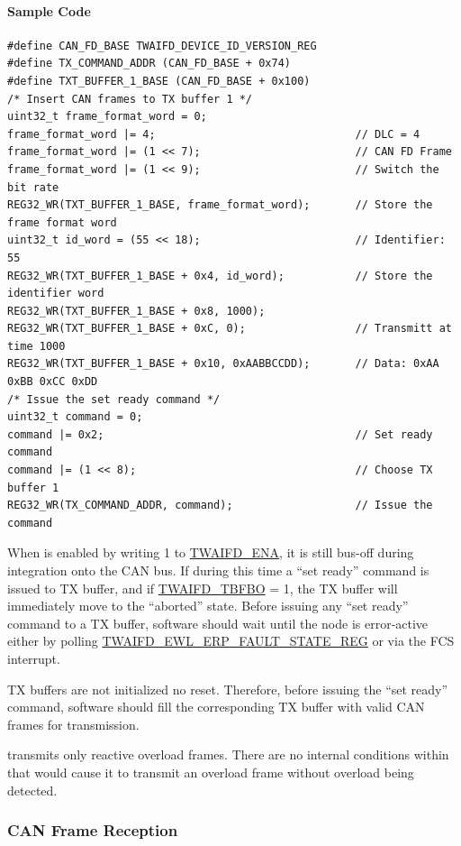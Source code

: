 \documentclass[main\_\_EN.tex]{subfiles}
\begin{document}
\paragraph{Sample Code}
\begin{lstlisting}
#define CAN_FD_BASE TWAIFD_DEVICE_ID_VERSION_REG
#define TX_COMMAND_ADDR (CAN_FD_BASE + 0x74)
#define TXT_BUFFER_1_BASE (CAN_FD_BASE + 0x100)
/* Insert CAN frames to TX buffer 1 */
uint32_t frame_format_word = 0;
frame_format_word |= 4;                               // DLC = 4
frame_format_word |= (1 << 7);                        // CAN FD Frame
frame_format_word |= (1 << 9);                        // Switch the bit rate
REG32_WR(TXT_BUFFER_1_BASE, frame_format_word);       // Store the frame format word
uint32_t id_word = (55 << 18);                        // Identifier: 55
REG32_WR(TXT_BUFFER_1_BASE + 0x4, id_word);           // Store the identifier word
REG32_WR(TXT_BUFFER_1_BASE + 0x8, 1000);
REG32_WR(TXT_BUFFER_1_BASE + 0xC, 0);                 // Transmitt at time 1000
REG32_WR(TXT_BUFFER_1_BASE + 0x10, 0xAABBCCDD);       // Data: 0xAA 0xBB 0xCC 0xDD
/* Issue the set ready command */
uint32_t command = 0;
command |= 0x2;                                       // Set ready command
command |= (1 << 8);                                  // Choose TX buffer 1
REG32_WR(TX_COMMAND_ADDR, command);                   // Issue the command
\end{lstlisting}

When \modulename{} is enabled by writing 1 to \hyperref[fielddesc:TWAIFDENA]{TWAIFD\_ENA}, it is still bus-off during integration onto the CAN bus. If during this time a ``set ready'' command is issued to TX buffer, and if \hyperref[fielddesc:TWAIFDTBFBO]{TWAIFD\_TBFBO} = 1, the TX buffer will immediately move to the ``aborted'' state. Before issuing any ``set ready'' command to a TX buffer, software should wait until the node is error-active either by polling \hyperref[regdesc:TWAIFDEWLERPFAULTSTATEREG]{TWAIFD\_EWL\_ERP\_FAULT\_STATE\_REG} or via the FCS interrupt.

TX buffers are not initialized no reset. Therefore, before issuing the ``set ready'' command, software should fill the corresponding TX buffer with valid CAN frames for transmission.

\modulename{} transmits only reactive overload frames. There are no internal conditions within \modulename{} that would cause it to transmit an overload frame without overload being detected.


\subsubsection{CAN Frame Reception}\label{sec:twai-prog-can-frame-recep}
\end{document}
